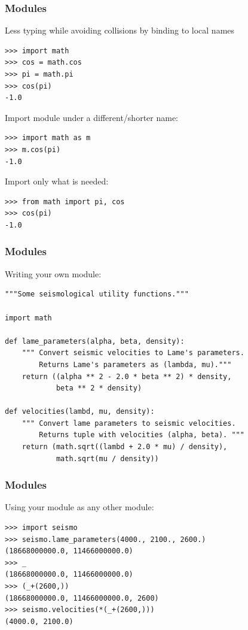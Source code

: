 \begin{frame}[fragile]
\frametitle{Modules}
Less typing while avoiding collisions by binding to local names
\begin{myColorBox}{0.9}{}
\begin{verbatim}
>>> import math
>>> cos = math.cos
>>> pi = math.pi
>>> cos(pi)
-1.0
\end{verbatim}
\end{myColorBox}

Import module under a different/shorter name:
\begin{myColorBox}{0.9}{}
\begin{verbatim}
>>> import math as m
>>> m.cos(pi)
-1.0
\end{verbatim}
\end{myColorBox}

Import only what is needed:
\begin{myColorBox}{0.9}{}
\begin{verbatim}
>>> from math import pi, cos
>>> cos(pi)
-1.0
\end{verbatim}
\end{myColorBox}
\end{frame}

\begin{frame}[fragile]
\frametitle{Modules}
Writing your own module:
\begin{verbatim}
"""Some seismological utility functions."""

import math

def lame_parameters(alpha, beta, density):
    """ Convert seismic velocities to Lame's parameters.
        Returns Lame's parameters as (lambda, mu)."""
    return ((alpha ** 2 - 2.0 * beta ** 2) * density,
            beta ** 2 * density)

def velocities(lambd, mu, density):
    """ Convert lame parameters to seismic velocities.
        Returns tuple with velocities (alpha, beta). """
    return (math.sqrt((lambd + 2.0 * mu) / density),
            math.sqrt(mu / density))
\end{verbatim}
\end{frame}

\begin{frame}[fragile]
\frametitle{Modules}
Using your module as any other module:
\begin{myColorBox}{0.9}{}
\begin{verbatim}
>>> import seismo
>>> seismo.lame_parameters(4000., 2100., 2600.)
(18668000000.0, 11466000000.0)
>>> _
(18668000000.0, 11466000000.0)
>>> (_+(2600,))
(18668000000.0, 11466000000.0, 2600)
>>> seismo.velocities(*(_+(2600,)))
(4000.0, 2100.0)
\end{verbatim}
\end{myColorBox}
\end{frame}

